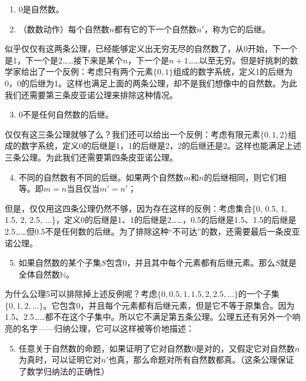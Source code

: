\documentclass[b5paper]{ctexart}
\begin{document}
\begin{enumerate}[公理1)]
\item 0是自然数。
\item （数数动作）每个自然数$n$都有它的下一个自然数$n'$，称为它的后继。
\end{enumerate}

似乎仅仅有这两条公理，已经能够定义出无穷无尽的自然数了，从0开始，下一个是1，下一个是2……接下来是某个$n$，下一个是$n+1$……以至无穷。但是好挑刺的数学家给出了一个反例：考虑只有两个元素$\{0, 1\}$组成的数字系统，定义1的后继为0，0的后继为1。这样也满足上面的两条公理，却不是我们想像中的自然数。为此我们还需要第三条皮亚诺公理来排除这种情况。

\begin{enumerate}[公理1)]
  \setcounter{enumi}{2}
  \item 0不是任何自然数的后继。
\end{enumerate}

仅仅有这三条公理就够了么？我们还可以给出一个反例：考虑有限元素$\{0, 1, 2\}$组成的数字系统，定义0的后继是1，1的后继是2，2的后继还是2。这样也能满足上述三条公理。为此我们还需要第四条皮亚诺公理。

\begin{enumerate}[公理1)]
  \setcounter{enumi}{3}
  \item 不同的自然数有不同的后继。如果两个自然数$m$和$n$的后继相同，则它们相等。即$m = n$当且仅当$m' = n'$；
\end{enumerate}

但是，仅仅用这四条公理仍然不够，因为存在这样的反例：考虑集合\{0, 0.5, 1, 1.5, 2, 2.5, ...\}，定义0的后继是1、1的后继是2……，0.5的后继是1.5、1.5的后继是2.5……但0.5不是任何数的后继。为了排除这种“不可达”的数，还需要最后一条皮亚诺公理。

\begin{enumerate}[公理1)]
  \setcounter{enumi}{4}
  \item 如果自然数的某个子集$S$包含0，并且其中每个元素都有后继元素。那么$S$就是全体自然数$\mathbb{N}$。
\end{enumerate}

 
为什么公理5可以排除掉上述反例呢？考虑$\{0, 0.5, 1, 1.5, 2, 2.5, ...\}$的一个子集$\{0, 1, 2, ...\}$。它包含0，并且每个元素都有后继元素，但是它不等于原集合。因为1.5、2.5……都不在这个子集中。所以它不满足第五条公理。公理五还有另外一个响亮的名字——归纳公理，它可以这样被等价地描述：

\begin{enumerate}[公理1)]
  \setcounter{enumi}{4}
  \item 任意关于自然数的命题，如果证明了它对自然数0是对的，又假定它对自然数$n$为真时，可以证明它对$n'$也真，那么命题对所有自然数都真。（这条公理保证了数学归纳法的正确性）
\end{enumerate}
\end{document}
